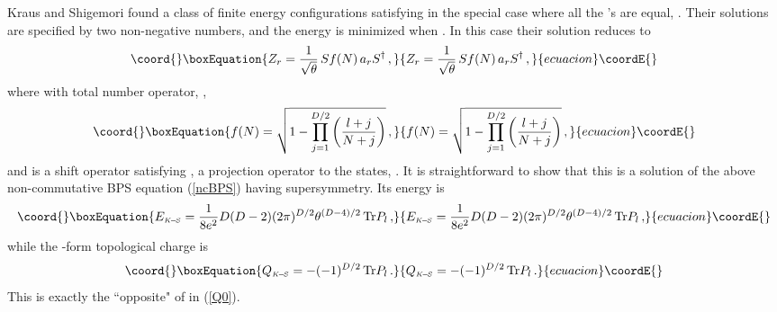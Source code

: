 \documentclass[a4paper,11pt]{article}
\def\Tr{{\rm Tr}}
\begin{document}
Kraus and Shigemori found a class of finite energy configurations  satisfying \coordHE{} in the special case where all the \coordHE{}'s are
equal, \coordHE{}. Their solutions are specified by two non-negative numbers,  \coordHE{} and the energy is minimized when \coordHE{}. In
this case  their solution reduces to
\begin{equation}\coord{}\boxEquation{
Z_{r}=\frac{1}{\sqrt{\theta}}\,Sf(N)\,a_{r}S^{\dagger}\,,
}{
Z_{r}=\frac{1}{\sqrt{\theta}}\,Sf(N)\,a_{r}S^{\dagger}\,,
}{ecuacion}\coordE{}\end{equation}
where with total number operator, \coordHE{},
\begin{equation}\coord{}\boxEquation{
f(N)=\sqrt{1-\prod_{j=1}^{D/2}\left(\frac{l+j}{N+j}\right)}\,,
}{
f(N)=\sqrt{1-\prod_{j=1}^{D/2}\left(\frac{l+j}{N+j}\right)}\,,
}{ecuacion}\coordE{}\end{equation}
and \coordHE{} is a shift operator satisfying \coordHE{}, a projection operator to the states, \coordHE{}.  It is
straightforward to show that this is a solution of the above  non-commutative BPS equation (\ref{ncBPS}) having
\coordHE{} supersymmetry.  Its energy is
\begin{equation}\coord{}\boxEquation{
E_{{\scriptscriptstyle K\!-\!S}}=\displaystyle{\frac{1}{8e^{2}}D(D-2)(2\pi)^{D/2}\theta^{(D-4)/2}\,\Tr P_{l}\,,} \label{KSE}
}{
E_{{\scriptscriptstyle K\!-\!S}}=\displaystyle{\frac{1}{8e^{2}}D(D-2)(2\pi)^{D/2}\theta^{(D-4)/2}\,\Tr P_{l}\,,} }{ecuacion}\coordE{}\end{equation}
while the \coordHE{}-form topological charge is
\begin{equation}\coord{}\boxEquation{
Q_{{\scriptscriptstyle K\!-\!S}}=-(-1)^{D/2}\,\Tr P_{l}\,.
}{
Q_{{\scriptscriptstyle K\!-\!S}}=-(-1)^{D/2}\,\Tr P_{l}\,.
}{ecuacion}\coordE{}\end{equation}
This is exactly the ``opposite" of \coordHE{} in (\ref{Q0}).\\
\end{document}
